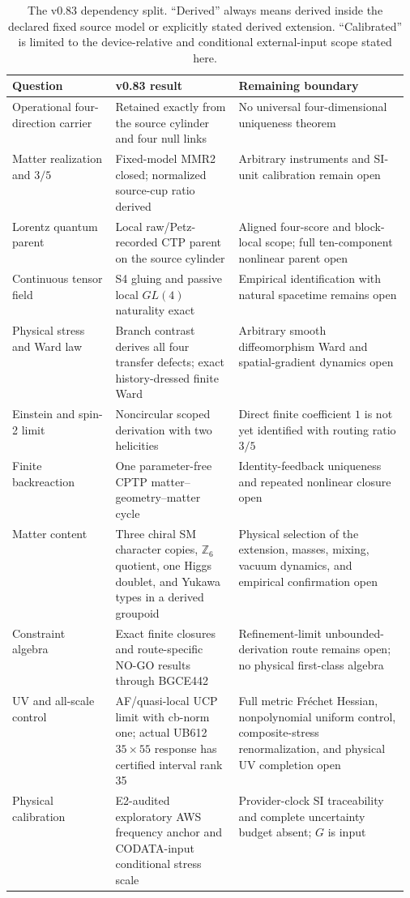 \documentclass[11pt]{article}
\theoremstyle{definition}
\theoremstyle{remark}
\begin{document}
\begin{table}[ht]
\centering
\small
\begin{tabularx}{\linewidth}{>{\raggedright\arraybackslash}p{0.26\linewidth} >{\raggedright\arraybackslash}p{0.31\linewidth} X}
\toprule
Question & v0.83 result & Remaining boundary \\
\midrule
Operational four-direction carrier & Retained exactly from the source cylinder and four null links & No universal four-dimensional uniqueness theorem \\
Matter realization and $3/5$ & Fixed-model MMR2 closed; normalized source-cup ratio derived & Arbitrary instruments and SI-unit calibration remain open \\
Lorentz quantum parent & Local raw/Petz-recorded CTP parent on the source cylinder & Aligned four-score and block-local scope; full ten-component nonlinear parent open \\
Continuous tensor field & S4 gluing and passive local $GL(4)$ naturality exact & Empirical identification with natural spacetime remains open \\
Physical stress and Ward law & Branch contrast derives all four transfer defects; exact history-dressed finite Ward & Arbitrary smooth diffeomorphism Ward and spatial-gradient dynamics open \\
Einstein and spin-2 limit & Noncircular scoped derivation with two helicities & Direct finite coefficient $1$ is not yet identified with routing ratio $3/5$ \\
Finite backreaction & One parameter-free CPTP matter--geometry--matter cycle & Identity-feedback uniqueness and repeated nonlinear closure open \\
Matter content & Three chiral SM character copies, $\mathbb Z_6$ quotient, one Higgs doublet, and Yukawa types in a derived groupoid & Physical selection of the extension, masses, mixing, vacuum dynamics, and empirical confirmation open \\
Constraint algebra & Exact finite closures and route-specific NO-GO results through BGCE442 & Refinement-limit unbounded-derivation route remains open; no physical first-class algebra \\
UV and all-scale control & AF/quasi-local UCP limit with cb-norm one; actual UB612 $35\times55$ response has certified interval rank 35 & Full metric Fr\'echet Hessian, nonpolynomial uniform control, composite-stress renormalization, and physical UV completion open \\
Physical calibration & E2-audited exploratory AWS frequency anchor and CODATA-input conditional stress scale & Provider-clock SI traceability and complete uncertainty budget absent; $G$ is input \\
\bottomrule
\end{tabularx}
\caption{The v0.83 dependency split. ``Derived'' always means derived inside the declared fixed source model or explicitly stated derived extension. ``Calibrated'' is limited to the device-relative and conditional external-input scope stated here.}
\label{tab:delta}
\end{table}
\end{document}
